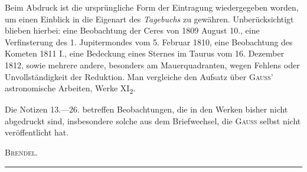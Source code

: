 Beim Abdruck ist die ursprüngliche Form der Eintragung wiedergegeben worden, um einen Einblick in die Eigenart des \textit{Tagebuchs} zu gewähren. Unberücksichtigt blieben hierbei: eine Beobachtung der Ceres von 1809 August 10., eine Verfinsterung des 1. Jupitermondes vom 5. Februar 1810, eine Beobachtung des Kometen 1811 I., eine Bedeckung eines Sternes im Taurus vom 16. Dezember 1812, sowie mehrere andere, besonders am Mauerquadranten, wegen Fehlens oder Unvollständigkeit der Reduktion. Man vergleiche den Aufsatz über \textsc{Gauss}’ astronomische Arbeiten, Werke XI\textsubscript{2}.

Die Notizen 13.—26. betreffen Beobachtungen, die in den Werken bisher nicht abgedruckt sind, insbesondere solche aus dem Briefwechsel, die \textsc{Gauss} selbst nicht veröffentlicht hat.
\begin{flushright}\textsc{Brendel}.\end{flushright}
\endgroup
\begin{center}\rule{.24\textwidth}{.35pt}\end{center}
\clearpage\endgroup
